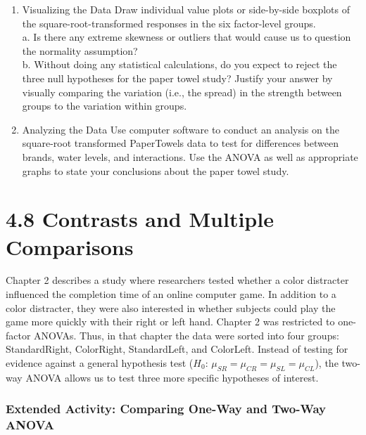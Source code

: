 \documentclass[
]{report}
\theoremstyle{definition}
\theoremstyle{definition}
\theoremstyle{definition}
\theoremstyle{definition}
\theoremstyle{remark}
\begin{document}
\begin{enumerate}
\def\labelenumi{\arabic{enumi}.}
\setcounter{enumi}{34}
\item
  Visualizing the Data Draw individual value plots or side-by-side boxplots of the square-root-transformed responses in the six factor-level groups.\\
  \hspace*{0.333em}\hspace*{0.333em}a. Is there any extreme skewness or outliers that would cause us to question the normality assumption?\\
  \hspace*{0.333em}\hspace*{0.333em}b. Without doing any statistical calculations, do you expect to reject the three null hypotheses for the paper towel study? Justify your answer by visually comparing the variation (i.e., the spread) in the strength between groups to the variation within groups.
\item
  Analyzing the Data Use computer software to conduct an analysis on the square-root transformed PaperTowels data to test for differences between brands, water levels, and interactions. Use the ANOVA as well as appropriate graphs to state your conclusions about the paper towel study.
\end{enumerate}

\hypertarget{contrasts-and-multiple-comparisons}{%
\chapter{4.8 Contrasts and Multiple Comparisons}\label{contrasts-and-multiple-comparisons}}

Chapter 2 describes a study where researchers tested whether a color distracter influenced the completion time of an online computer game. In addition to a color distracter, they were also interested in whether subjects could play the game more quickly with their right or left hand. Chapter 2 was restricted to one-factor ANOVAs. Thus, in that chapter the data were sorted into four groups: StandardRight, ColorRight, StandardLeft, and ColorLeft. Instead of testing for evidence against a general hypothesis test (\(H_0\): \(\mu_{SR} = \mu_{CR} = \mu_{SL} = \mu_{CL}\)), the two-way ANOVA allows us to test three more specific hypotheses of interest.

\hypertarget{extended-activity-comparing-one-way-and-two-way-anova}{%
\subsection{Extended Activity: Comparing One-Way and Two-Way ANOVA}\label{extended-activity-comparing-one-way-and-two-way-anova}}
\end{document}
